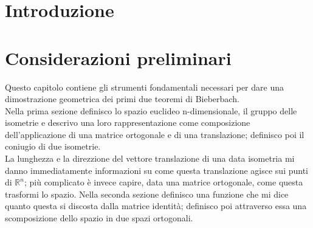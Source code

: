 \documentclass[10pt,a4paper]{article}
\author{Elisa Caruso}
\begin{document}
 

\section*{Introduzione}




\section{Considerazioni preliminari}
Questo capitolo contiene gli strumenti fondamentali necessari per dare una dimostrazione geometrica dei primi due teoremi di Bieberbach. \\
Nella prima sezione definisco lo spazio euclideo n-dimensionale, il gruppo delle isometrie e descrivo una loro rappresentazione come composizione dell'applicazione di una matrice ortogonale e di una translazione; definisco poi il coniugio di due isometrie. \\
La lunghezza e la direzzione del vettore translazione di una data isometria mi danno immediatamente informazioni su come questa translazione agisce sui punti di $\mathbb{R}^n$; più complicato è invece capire, data una matrice ortogonale, come questa trasformi lo spazio. Nella seconda sezione definisco una funzione che mi dice quanto questa si discosta dalla matrice identità; definisco poi attraverso essa una scomposizione dello spazio in due spazi ortogonali. 
\end{document}
